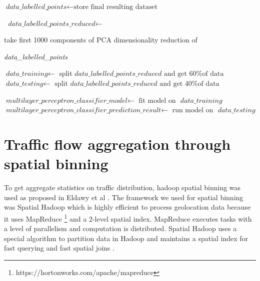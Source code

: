 \documentclass[12pt, a4paper]{report}
\theoremstyle{definition}
\theoremstyle{definition}%
\theoremstyle{definition}%
\theoremstyle{definition}%
\theoremstyle{definition}%
\theoremstyle{definition}%
\begin{document}
\begin{algorithm} [hpt]
\begin{algorithmic}[1]
			\State $\textit{data\_labelled\_points} \gets \text{store final resulting dataset}$
			
			\State $\textit{ data\_labelled\_points\_reduced} \gets$ \par 
					take first 1000 components of PCA dimensionality reduction of \par 
					\textit{ data\_labelled\_points}
			
			\State $\textit{data\_training} 	\gets$  $ \text{split } \textit{data\_labelled\_points\_reduced} \text{ and get 60\% of data }$
			\State $\textit{data\_testing} 	    \gets$  $ \text{split } \textit{data\_labelled\_points\_reduced} \text{ and get 40\% of data }$
			
			\State $\textit{multilayer\_perceptron\_classifier\_model} 	\gets$  $\text{fit model on } \textit{ data\_training}$	
			\State $\textit{multilayer\_perceptron\_classifier\_prediction\_result} 	\gets$  $\text{run model on } \textit{ data\_testing}$	
			\State {}
					
			
		\EndIndent 			

	\end{algorithmic}
\end{algorithm}




\section{Traffic flow aggregation through spatial binning} \label{section:spatial_binning}

To get aggregate statistics on traffic distribution, hadoop spatial binning was used as proposed in Eldawy et al \cite{eldawy2015spatialhadoop}. The framework we used for spatial binning was Spatial Hadoop which is highly efficient to process geolocation data because it uses MapReduce \footnote{https://hortonworks.com/apache/mapreduce} and a 2-level spatial index. MapReduce executes tasks with a level of parallelism and computation is distributed. Spatial Hadoop uses a special algorithm to partition data in Hadoop and maintains a spatial index for fast querying and fast spatial joins \cite{eldawy2015spatialhadoop}. 
\end{document}
